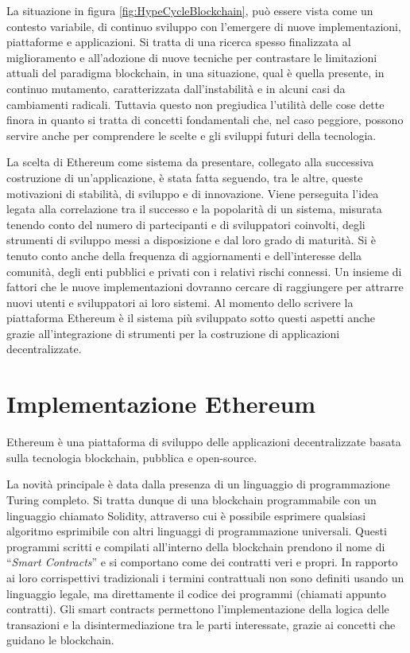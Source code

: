La situazione in figura \ref{fig:HypeCycleBlockchain}, può essere vista come un contesto variabile, di continuo sviluppo con l’emergere di nuove implementazioni, piattaforme e applicazioni. Si tratta di una ricerca spesso finalizzata al miglioramento e all'adozione di nuove tecniche per contrastare le limitazioni attuali del paradigma blockchain, in una situazione, qual è quella presente, in continuo mutamento, caratterizzata dall'instabilità e in alcuni casi da cambiamenti radicali. Tuttavia questo non pregiudica l’utilità delle cose dette finora in quanto si tratta di concetti fondamentali che, nel caso peggiore, possono servire anche per comprendere le scelte e gli sviluppi futuri della tecnologia.

La scelta di Ethereum come sistema da presentare, collegato alla successiva costruzione di un’applicazione, è stata fatta seguendo, tra le altre, queste motivazioni di stabilità, di sviluppo e di innovazione. Viene perseguita l'idea legata alla correlazione tra il successo e la popolarità di un sistema, misurata tenendo conto del numero di partecipanti e di sviluppatori coinvolti, degli strumenti di sviluppo messi a disposizione e dal loro grado di maturità. Si è tenuto conto anche della frequenza di aggiornamenti e dell’interesse della comunità, degli enti pubblici e privati con i relativi rischi connessi. Un insieme di fattori che le nuove implementazioni dovranno cercare di raggiungere per attrarre nuovi utenti e sviluppatori ai loro sistemi. Al momento dello scrivere la piattaforma Ethereum è il sistema più sviluppato sotto questi aspetti anche grazie all'integrazione di strumenti per la costruzione di applicazioni decentralizzate.

\section{Implementazione Ethereum}

Ethereum è una piattaforma di sviluppo delle applicazioni decentralizzate basata sulla tecnologia blockchain, pubblica e open-source.

La novità principale è data dalla presenza di un linguaggio di programmazione Turing completo. Si tratta dunque di una blockchain programmabile con un linguaggio chiamato Solidity, attraverso cui è possibile esprimere qualsiasi algoritmo esprimibile con altri linguaggi di programmazione universali. Questi programmi scritti e compilati all’interno della blockchain prendono il nome di “\emph{Smart Contracts}” e si comportano come dei contratti veri e propri. In rapporto ai loro corrispettivi tradizionali i termini contrattuali non sono definiti usando un linguaggio legale, ma direttamente il codice dei programmi (chiamati appunto contratti). Gli smart contracts permettono l’implementazione della logica delle transazioni e la disintermediazione tra le parti interessate, grazie ai concetti che guidano le blockchain. 

